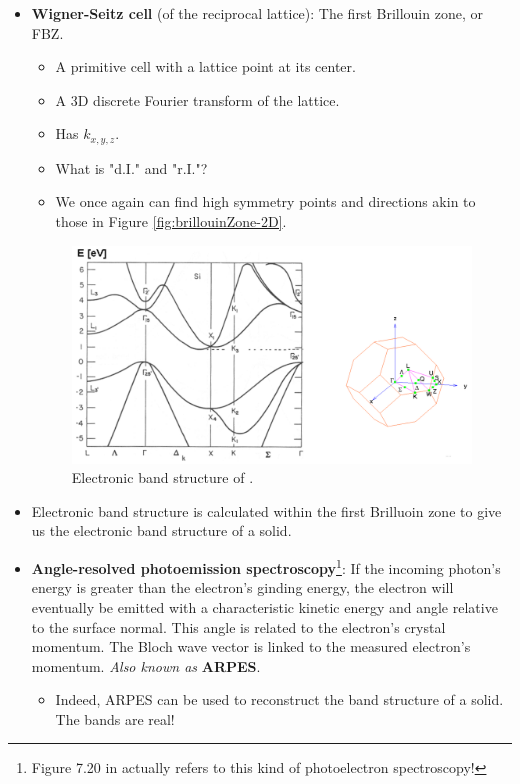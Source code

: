 \documentclass[../notes.tex]{subfiles}
\begin{document}
\begin{itemize}
    \item \textbf{Wigner-Seitz cell} (of the reciprocal lattice): The first Brillouin zone, or FBZ.
    \begin{itemize}
        \item A primitive cell with a lattice point at its center.
        \item A 3D discrete Fourier transform of the lattice.
        \item Has $k_{x,y,z}$.
        \item What is "d.I." and "r.I."?
        \item We once again can find high symmetry points and directions akin to those in Figure \ref{fig:brillouinZone-2D}.
    \end{itemize}
    \begin{figure}[h!]
        \centering
        \includegraphics[width=0.75\linewidth]{../ExtFiles/bandStructure-Si.png}
        \caption{Electronic band structure of .}
        \label{fig:bandStructure-Si}
    \end{figure}
    \item Electronic band structure is calculated within the first Brilluoin zone to give us the electronic band structure of a solid.
    \item \textbf{Angle-resolved photoemission spectroscopy}\footnote{Figure 7.20 in \textcite{bib:APChemNotes} actually refers to this kind of photoelectron spectroscopy!}: If the incoming photon's energy is greater than the electron's ginding energy, the electron will eventually be emitted with a characteristic kinetic energy and angle relative to the surface normal. This angle is related to the electron's crystal momentum. The Bloch wave vector is linked to the measured electron's momentum. \emph{Also known as} \textbf{ARPES}.
    \begin{itemize}
        \item Indeed, ARPES can be used to reconstruct the band structure of a solid. The bands are real!
    \end{itemize}
\end{itemize}
\end{document}
